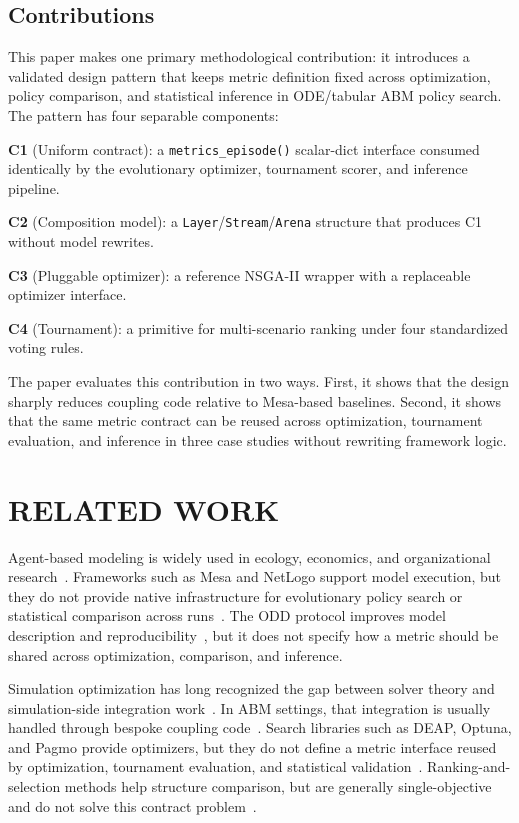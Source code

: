 \documentclass{wscpaperproc}
\begin{document}
\subsection{Contributions}

This paper makes one primary methodological contribution: it introduces a
validated design pattern that keeps metric definition fixed across optimization,
policy comparison, and statistical inference in ODE/tabular ABM policy search.
The pattern has four separable components:

\textbf{C1} (Uniform contract): a \texttt{metrics\_episode()} scalar-dict
interface consumed identically by the evolutionary optimizer, tournament scorer,
and inference pipeline.

\textbf{C2} (Composition model): a \texttt{Layer}/\texttt{Stream}/\texttt{Arena}
structure that produces C1 without model rewrites.

\textbf{C3} (Pluggable optimizer): a reference NSGA-II wrapper with a replaceable
optimizer interface.

\textbf{C4} (Tournament): a primitive for multi-scenario ranking under four
standardized voting rules.

The paper evaluates this contribution in two ways. First, it shows that the
design sharply reduces coupling code relative to Mesa-based baselines. Second,
it shows that the same metric contract can be reused across optimization,
tournament evaluation, and inference in three case studies without rewriting
framework logic.

\section{RELATED WORK}

Agent-based modeling is widely used in ecology, economics, and organizational
research~\cite{grimm2006odd,tesfatsion2006ace,bonabeau2002abm}. Frameworks such
as Mesa and NetLogo support model execution, but they do not provide native
infrastructure for evolutionary policy search or statistical comparison across
runs~\cite{macal2010tutorial,kazil2020mesa,wilensky1999netlogo}. The ODD
protocol improves model description and reproducibility~\cite{grimm2006odd}, but
it does not specify how a metric should be shared across optimization,
comparison, and inference.

Simulation optimization has long recognized the gap between solver theory and
simulation-side integration work~\cite{fu2002optimization,hong2009brief}. In ABM
settings, that integration is usually handled through bespoke coupling
code~\cite{pangallo2019best,capri2023transport,zheng2022aieconomist}. Search
libraries such as DEAP, Optuna, and Pagmo provide optimizers, but they do not
define a metric interface reused by optimization, tournament evaluation, and
statistical validation~\cite{fortin2012deap,akiba2019optuna,biscani2020pagmo}.
Ranking-and-selection methods help structure comparison, but are generally
single-objective and do not solve this contract problem~\cite{goldsman1994ranking}.
\end{document}
